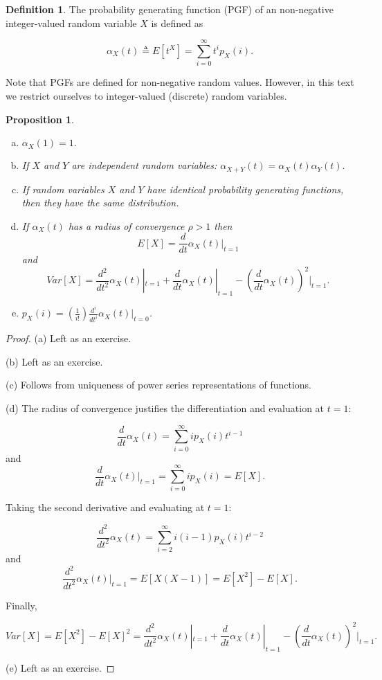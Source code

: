\documentclass{book}
\theoremstyle{plain}%
\newtheorem{proposition}{Proposition}[section]
\theoremstyle{definition}
\newtheorem{definition}{Definition}[section]
\begin{document}
\begin{definition}
The probability generating function (PGF) of an non-negative integer-valued random variable $X$ is defined as

$$\alpha_X(t) \triangleq E[t^X] = \sum_{i = 0}^\infty t^ip_X(i) .$$
\end{definition}

Note that PGFs are defined for non-negative random values. However, in this text we restrict ourselves to integer-valued (discrete) random variables.

\begin{proposition}
\text{ } \newline
\begin{enumerate}[(a)]
\item $\alpha_X(1) = 1.$
\item If $X$ and $Y$ are independent random variables: $\alpha_{X+Y}(t) = \alpha_{X}(t)\alpha_{Y}(t).$
\item If random variables $X$ and $Y$ have identical probability generating functions, then they have the same distribution.
\item If $\alpha_X(t)$ has a radius of convergence $\rho > 1$ then $$E[X] = \frac{d}{dt}\alpha_X(t)|_{t=1}$$ and $$Var[X] = \frac{d^2}{dt^2}\alpha_X(t)|_{t=1} + \frac{d}{dt}\alpha_X(t)|_{t=1} - (\frac{d}{dt}\alpha_X(t))^2|_{t=1}.$$
\item $p_X(i) = \left(\frac{1}{i!}\right)\frac{d^i}{dt^i}\alpha_X(t)|_{t=0}$.\end{enumerate}\label{prop:pgf}
\end{proposition}

\begin{proof}
(a) Left as an exercise.

(b) Left as an exercise.

(c) Follows from uniqueness of power series representations of functions.

(d) The radius of convergence justifies the differentiation and evaluation at $t=1$:

$$\frac{d}{dt}\alpha_X(t) = \sum_{i=0}^\infty ip_X(i)t^{i-1}$$ and $$\frac{d}{dt}\alpha_X(t)|_{t=1}=\sum_{i=0}^\infty i p_X(i) = E[X].$$

Taking the second derivative and evaluating at $t=1$:

$$\frac{d^2}{dt^2}\alpha_X(t) = \sum_{i=2}^\infty i(i-1)p_X(i)t^{i-2}$$ and $$\frac{d^2}{dt^2}\alpha_X(t)|_{t=1} = E[X(X-1)] = E[X^2] - E[X].$$

Finally,

$$Var[X] = E[X^2] - E[X]^2 = \frac{d^2}{dt^2}\alpha_X(t)|_{t=1} + \frac{d}{dt}\alpha_X(t)|_{t=1} - (\frac{d}{dt}\alpha_X(t))^2|_{t=1}.$$

(e) Left as an exercise.
\end{proof}
\end{document}
